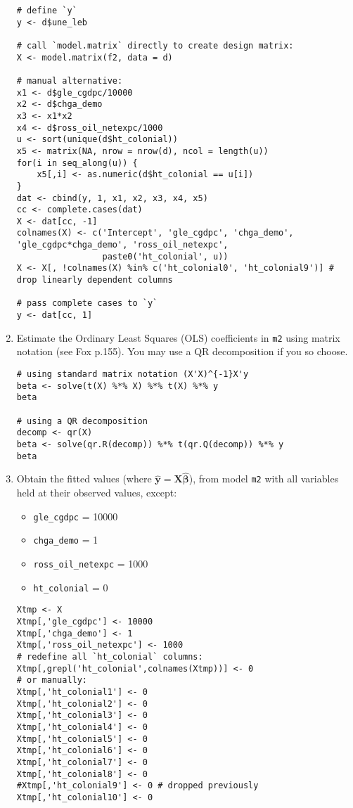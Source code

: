 \documentclass[a4paper,12pt]{article}
\newcommand{\matr}[1]{\mathbf{#1}}
\begin{document}
\begin{enumerate}
\begin{solution}
\begin{lstlisting}
# define `y`
y <- d$une_leb

# call `model.matrix` directly to create design matrix:
X <- model.matrix(f2, data = d)

# manual alternative:
x1 <- d$gle_cgdpc/10000
x2 <- d$chga_demo
x3 <- x1*x2
x4 <- d$ross_oil_netexpc/1000
u <- sort(unique(d$ht_colonial))
x5 <- matrix(NA, nrow = nrow(d), ncol = length(u))
for(i in seq_along(u)) {
    x5[,i] <- as.numeric(d$ht_colonial == u[i])
}
dat <- cbind(y, 1, x1, x2, x3, x4, x5)
cc <- complete.cases(dat)
X <- dat[cc, -1]
colnames(X) <- c('Intercept', 'gle_cgdpc', 'chga_demo', 'gle_cgdpc*chga_demo', 'ross_oil_netexpc',
                 paste0('ht_colonial', u))
X <- X[, !colnames(X) %in% c('ht_colonial0', 'ht_colonial9')] # drop linearly dependent columns

# pass complete cases to `y`
y <- dat[cc, 1]
\end{lstlisting}
\end{solution}


\item Estimate the Ordinary Least Squares (OLS) coefficients in \texttt{m2} using matrix notation (see Fox p.155). You may use a QR decomposition if you so choose.

\begin{solution}
\begin{lstlisting}
# using standard matrix notation (X'X)^{-1}X'y
beta <- solve(t(X) %*% X) %*% t(X) %*% y
beta

# using a QR decomposition
decomp <- qr(X)
beta <- solve(qr.R(decomp)) %*% t(qr.Q(decomp)) %*% y
beta
\end{lstlisting}
\end{solution}

\item Obtain the fitted values (where $\matr{\hat{y}} = \matr{X}\matr{\hat{\beta}}$), from model \texttt{m2} with all variables held at their observed values, except:

\begin{itemize}
\item \texttt{gle\_cgdpc} = 10000
\item \texttt{chga\_demo} = 1
\item \texttt{ross\_oil\_netexpc} = 1000
\item \texttt{ht\_colonial} = 0
\end{itemize}

\begin{solution}
\begin{lstlisting}
Xtmp <- X
Xtmp[,'gle_cgdpc'] <- 10000
Xtmp[,'chga_demo'] <- 1
Xtmp[,'ross_oil_netexpc'] <- 1000
# redefine all `ht_colonial` columns:
Xtmp[,grepl('ht_colonial',colnames(Xtmp))] <- 0
# or manually:
Xtmp[,'ht_colonial1'] <- 0
Xtmp[,'ht_colonial2'] <- 0
Xtmp[,'ht_colonial3'] <- 0
Xtmp[,'ht_colonial4'] <- 0
Xtmp[,'ht_colonial5'] <- 0
Xtmp[,'ht_colonial6'] <- 0
Xtmp[,'ht_colonial7'] <- 0
Xtmp[,'ht_colonial8'] <- 0
#Xtmp[,'ht_colonial9'] <- 0 # dropped previously
Xtmp[,'ht_colonial10'] <- 0


\end{lstlisting}
\end{solution}
\end{enumerate}
\end{document}
